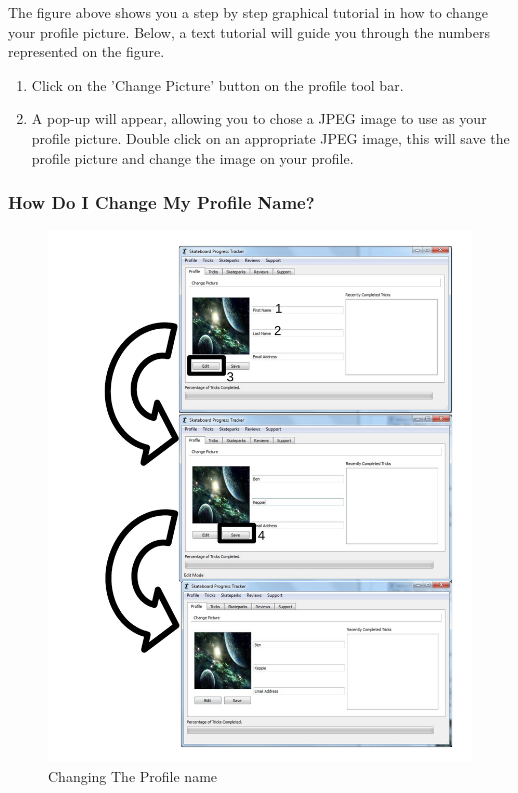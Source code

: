 The figure above shows you a step by step graphical tutorial in how to change your profile picture. Below, a text tutorial will guide you through the numbers represented on the figure.
\begin{enumerate}
\item Click on the 'Change Picture' button on the profile tool bar.
\item A pop-up will appear, allowing you to chose a JPEG image to use as your profile picture. Double click on an appropriate JPEG image, this will save the profile picture and change the image on your profile.
\end{enumerate}


\subsubsection{How Do I Change My Profile Name?}

\begin{figure}[H]
    \includegraphics[width=\textwidth]{./Manual/Images/ChangeName.pdf}
    \caption{Changing The Profile name} \label{fig:Change Name}
\end{figure}

